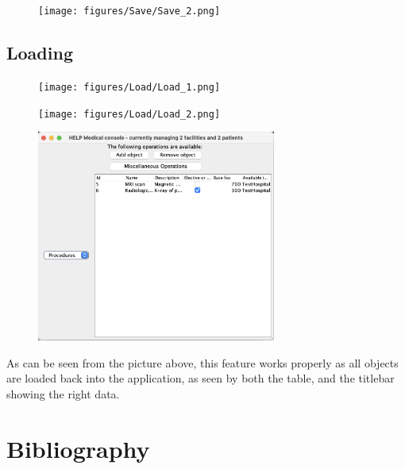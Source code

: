 \documentclass{article}
\begin{document}
\begin{figure}[ht]
  \begin{center}
    \texttt{[image: figures/Save/Save\_2.png]}
  \end{center}
\end{figure}

\subsection{Loading}\label{sub:loading} %
\begin{figure}[ht]
  \begin{center}
    \texttt{[image: figures/Load/Load\_1.png]}
  \end{center}
\end{figure}

\begin{figure}[ht]
  \begin{center}
    \texttt{[image: figures/Load/Load\_2.png]}
  \end{center}
\end{figure}

\begin{figure}[ht]
  \begin{center}
    \includegraphics[width=0.7\textwidth]{figures/Load/Load_3.png}
  \end{center}
\end{figure}

As can be seen from the picture above, this feature works properly as all objects are loaded back into the application, as seen by both the table, and the titlebar showing the right data.

\section{Bibliography}\label{sec:bibliography} %
\printbibliography

\end{document}
